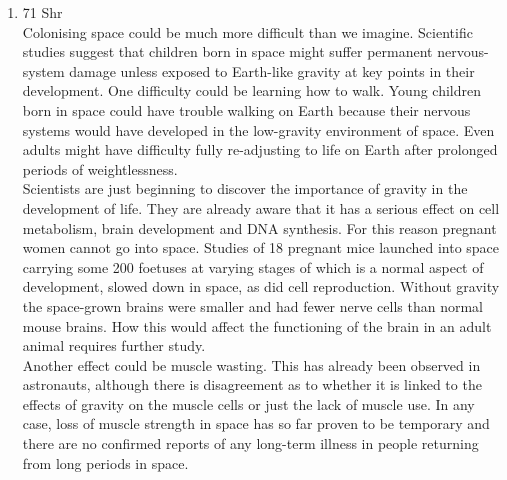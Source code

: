 \documentclass[12pt]{article}
\begin{document}
\begin{enumerate}
      It astonished one to find that men who were learned in every detail of the struggles between Athens and Sparta, between Rome and Carthage, could be indifferent to a struggle almost at their own doors a struggle, too, in which the prizes were not the sordid gains of political warfare, but the magnificently empty honors of sport. All present were pacifists, yet bloody battles fascinated their intellects far more than the bloodless battles of the football field - the battles, so to speak, of the future. Such indifference to an exciting phase of contemporary life shocked me. I could have understood a stockbroker’s being indifferent to the result of a great football match, but a university man, a fine mind strained in the humanities that was a very different affair. I left Cambridge a little saddened over the prospects of the human race.

    \item 71 Shr\\
      Colonising space could be much more difficult than we imagine. Scientific studies suggest that children born in space might suffer permanent nervous-system damage unless exposed to Earth-like gravity at key points in their development. One difficulty could be learning how to walk. Young children born in space could have trouble walking on Earth because their nervous systems would have developed in the low-gravity environment of space. Even adults might have difficulty fully re-adjusting to life on Earth after prolonged periods of weightlessness.\\

      Scientists are just beginning to discover the importance of gravity in the development of life. They are already aware that it has a serious effect on cell metabolism, brain development and DNA synthesis. For this reason pregnant women cannot go into space. Studies of 18 pregnant mice launched into space carrying some 200 foetuses at varying stages of which is a normal aspect of development, slowed down in space, as did cell reproduction. Without gravity the space-grown brains were smaller and had fewer nerve cells than normal mouse brains. How this would affect the functioning of the brain in an adult animal requires further study.\\

      Another effect could be muscle wasting. This has already been observed in astronauts, although there is disagreement as to whether it is linked to the effects of gravity on the muscle cells or just the lack of muscle use. In any case, loss of muscle strength in space has so far proven to be temporary and there are no confirmed reports of any long-term illness in people returning from long periods in space.\\


\end{enumerate}
\end{document}
